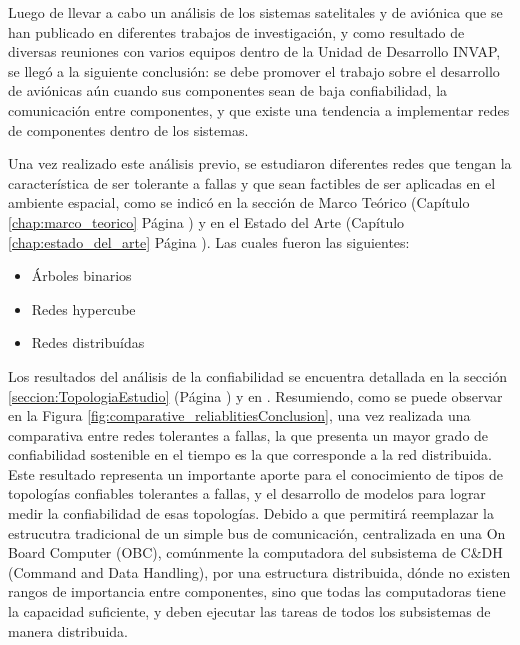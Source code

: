 Luego de llevar a cabo un análisis de los sistemas satelitales y de aviónica que se
han publicado en diferentes trabajos de investigación, y como resultado de  diversas reuniones
con varios equipos dentro de la Unidad de Desarrollo INVAP, se llegó a la siguiente conclusión:
se debe promover el trabajo sobre el desarrollo de aviónicas aún cuando sus componentes
sean de baja confiabilidad, la comunicación entre componentes,
y que existe una tendencia a implementar redes de componentes dentro de los sistemas.

Una vez realizado este análisis previo, se estudiaron diferentes redes que tengan
la característica de ser tolerante a fallas y que sean factibles de ser
aplicadas en el ambiente espacial, como se indicó en la sección de Marco
Teórico (Capítulo \ref{chap:marco_teorico} Página \pageref{chap:marco_teorico}) y en
el Estado del Arte (Capítulo \ref{chap:estado_del_arte} Página \pageref{chap:estado_del_arte}).
Las cuales fueron las siguientes:
\begin{itemize}
\item Árboles binarios
\item Redes hypercube
\item Redes distribuídas
\end{itemize}

Los resultados del análisis de la confiabilidad se encuentra detallada en la sección
\ref{seccion:TopologiaEstudio} (Página \pageref{seccion:TopologiaEstudio}) y en
\cite{Arias17}. Resumiendo, como se puede observar en la Figura
\ref{fig:comparative_reliablitiesConclusion}, una vez realizada una comparativa
entre redes tolerantes a fallas, la que presenta un mayor grado
de confiabilidad sostenible en el tiempo es la que corresponde a
la red distribuida. Este resultado representa un importante aporte para el
conocimiento de tipos de topologías confiables tolerantes a fallas, y el desarrollo de
modelos para lograr medir la confiabilidad de esas topologías. Debido a que
permitirá reemplazar la estrucutra tradicional de un simple bus de comunicación, centralizada
en una On Board Computer (OBC), comúnmente la computadora del subsistema de C&DH
(Command and Data Handling), por una estructura distribuida, dónde no existen
rangos de importancia entre componentes,  sino que todas las computadoras
tiene la capacidad suficiente, y deben ejecutar las tareas de todos los subsistemas
de manera distribuida. 

\begin{comment}
Los resultados de
este estudio fueron presentados en el \textit{Congreso Argentino de Tecnologías
  Espaciales 2017 (Córdoba, Argentina)}
\end{comment}

